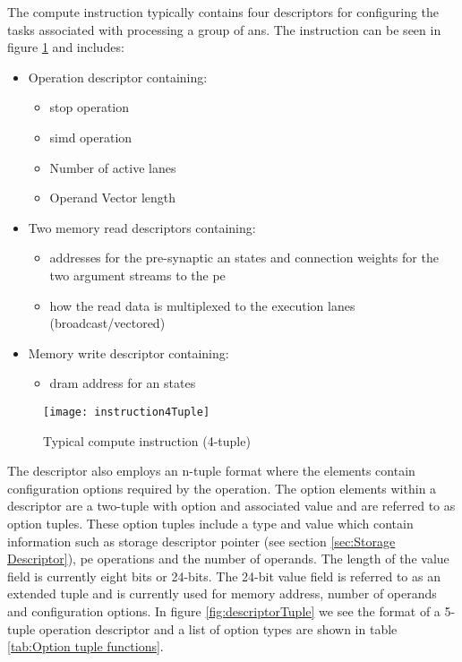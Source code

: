 The compute instruction typically contains four descriptors for configuring the tasks associated with processing a group of \acp{an}.
The instruction can be seen in figure \ref{fig:Instruction (4-tuple example)} and includes: 
\begin{itemize}
  \item Operation descriptor containing:
    \begin{itemize}
      \item \ac{stop} operation
      \item \ac{simd} operation
      \item Number of active lanes
      \item Operand Vector length
    \end{itemize}
  \item Two memory read descriptors containing:
    \begin{itemize}
        \item addresses for the pre-synaptic \ac{an} states and connection weights for the two argument streams to the \ac{pe}
        \item how the read data is multiplexed to the execution lanes (broadcast/vectored)
    \end{itemize}
  \item Memory write descriptor containing:
    \begin{itemize}
      \item \ac{dram} address for \ac{an} states
    \end{itemize}
\end{itemize}

\begin{figure}[!t]
\centering
\captionsetup{justification=centering}
\captionsetup{width=.9\linewidth}
\centerline{
\mbox{\texttt{[image: instruction4Tuple]}}
}
\caption{Typical compute instruction (4-tuple)}
\label{fig:Instruction (4-tuple example)}
\end{figure}


The descriptor also employs an n-tuple format where the elements contain configuration options required by the operation.
The option elements within a descriptor are a two-tuple with option and associated value and are referred to as option tuples.
These option tuples include a type and value which contain information such as storage descriptor pointer (see section \ref{sec:Storage Descriptor}), \ac{pe} operations and the number of operands.
The length of the value field is currently eight bits or 24-bits. The 24-bit value field is referred to as an extended tuple and is currently used for memory address, number of operands and configuration options.
In figure \ref{fig:descriptorTuple} we see the format of a 5-tuple operation descriptor and a list of option types are shown in table \ref{tab:Option tuple functions}.

